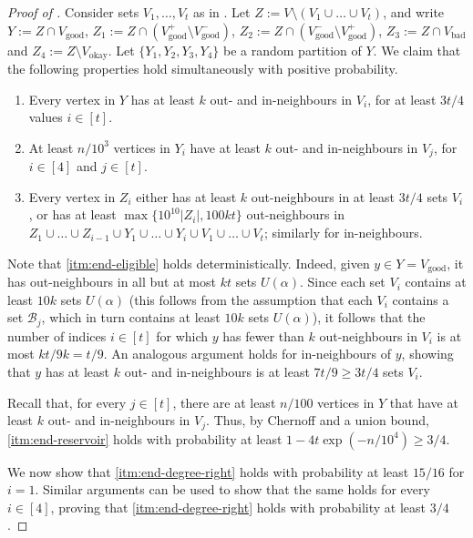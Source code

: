 \documentclass[english]{article}
\theoremstyle{plain}
\theoremstyle{remark}
\def\B{\mathcal{B}}
\def \Vgp {V_{\good}^+}
\def \Vgp {V_{\good}^+}
\def \Vgm {V_{\good}^-}
\def \Vo {V_{\okay}}
\def \Vg {V_{\good}}
\def \Vb {V_{\bad}}
\def \Vgm {V_{\good}^-}
\DeclareMathOperator{\bad}{bad}
\DeclareMathOperator{\good}{good}
\DeclareMathOperator{\okay}{okay}
\begin{document}
\begin{proof}[Proof of ]
		Consider sets $V_1, \ldots, V_{t}$ as in . Let $Z := V \setminus (V_1 \cup \ldots \cup V_{t})$, and write $Y := Z \cap \Vg$, $Z_1 := Z \cap (\Vgp \setminus \Vgm)$, $Z_2 := Z \cap (\Vgm \setminus \Vgp)$, $Z_3 := Z \cap \Vb$ and $Z_4 := Z \setminus \Vo$.
		Let $\{Y_1,Y_2, Y_3, Y_4\}$ be a random partition of $Y$. We claim that the following properties hold simultaneously with positive probability.
		\begin{enumerate}[label = \rm(\alph*)]
			\item \label{itm:end-eligible}
				Every vertex in $Y$ has at least $k$ out- and in-neighbours in $V_i$, for at least $3t/4$ values $i \in [t]$.
			\item \label{itm:end-reservoir}
				At least $n/10^3$ vertices in $Y_i$ have at least $k$ out- and in-neighbours in $V_j$, for $i \in [4]$ and $j \in [t]$.
			\item \label{itm:end-degree-right}
				Every vertex in $Z_i$ either has at least $k$ out-neighbours in at least $3t/4$ sets $V_i$, or has at least $\max\{10^{10} |Z_i|, 100 kt\}$ out-neighbours in $Z_1 \cup \ldots \cup Z_{i-1} \cup Y_1 \cup \ldots \cup Y_i \cup V_1 \cup \ldots \cup V_{t}$; similarly for in-neighbours.
		\end{enumerate}
		Note that \ref{itm:end-eligible} holds deterministically. Indeed, given $y \in Y = \Vg$, it has out-neighbours in all but at most $kt$ sets $U(\alpha)$. Since each set $V_i$ contains at least $10k$ sets $U(\alpha)$ (this follows from the assumption that each $V_i$ contains a set $\B_j$, which in turn contains at least $10k$ sets $U(\alpha)$), it follows that the number of indices $i \in [t]$ for which $y$ has fewer than $k$ out-neighbours in $V_i$ is at most $kt / 9k = t/9$. An analogous argument holds for in-neighbours of $y$, showing that $y$ has at least $k$ out- and in-neighbours is at least $7t/9 \ge 3t/4$ sets $V_i$.

		Recall that, for every $j \in [t]$, there are at least $n / 100$ vertices in $Y$ that have at least $k$ out- and in-neighbours in $V_j$. Thus, by Chernoff and a union bound, \ref{itm:end-reservoir} holds with probability at least $1 - 4t \exp(-n/10^4) \ge 3/4$.

		We now show that \ref{itm:end-degree-right} holds with probability at least $15/16$ for $i = 1$. Similar arguments can be used to show that the same holds for every $i \in [4]$, proving that \ref{itm:end-degree-right} holds with probability at least $3/4$.


\end{proof}
\end{document}
